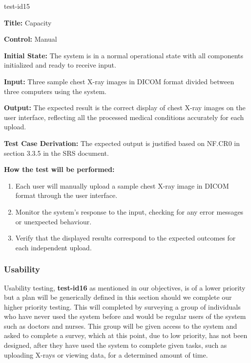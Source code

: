 \documentclass[12pt, titlepage]{article}
\begin{document}
\begin{itemize}
    \begin{item}
        test-id15
        \begin{mdframed}[linewidth=0.5mm]
            \textbf{Title:} Capacity \par
            \textbf{Control:} Manual \par
            \textbf{Initial State:} The system is in a normal operational state with all components initialized and ready to receive input. \par
            \textbf{Input:} Three sample chest X-ray images in DICOM format divided between three computers using the system. \par
            \textbf{Output:} The expected result is the correct display of chest X-ray images on the user interface, reflecting all the processed medical conditions accurately for each upload.  \par
            \textbf{Test Case Derivation:} The expected output is justified based on NF.CR0 in section 3.3.5 in the SRS document. \par
            \textbf{How the test will be performed:}
            \begin{enumerate}[noitemsep]
                \item Each user will manually upload a sample chest X-ray image in DICOM format through the user interface.
                \item Monitor the system's response to the input, checking for any error messages or unexpected behaviour.
                \item Verify that the displayed results correspond to the expected outcomes for each independent upload.
            \end{enumerate}
        \end{mdframed}
    \end{item}
\end{itemize}

\subsubsection{Usability} \hypertarget{Usability}{}
\noindent Usability testing, \textbf{test-id16} as mentioned in our objectives, is of a lower priority but a plan will be generically defined in this section should we complete our higher priority testing. This will completed by surveying a group of individuals who have never used the system before and would be regular users of the system such as doctors and nurses. This group will be given access to the system and asked to complete a survey, which at this point, due to low priority, has not been designed, after they have used the system to complete given tasks, such as uploading X-rays or viewing data, for a determined amount of time.
\end{document}
